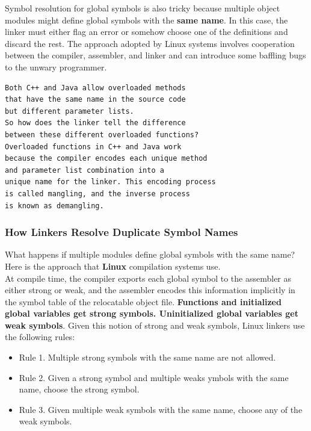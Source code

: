 \documentclass[11pt]{article}
\begin{document}
Symbol resolution for global symbols is also tricky because multiple object modules might define global symbols with the \textbf{same name}. In this case, the linker must either flag an error or somehow choose one of the definitions and discard the rest. The approach adopted by Linux systems involves cooperation between the compiler, assembler, and linker and can introduce some baffling bugs to the unwary programmer.\\


\begin{verbatim}
Both C++ and Java allow overloaded methods 
that have the same name in the source code 
but different parameter lists. 
So how does the linker tell the difference 
between these different overloaded functions? 
Overloaded functions in C++ and Java work 
because the compiler encodes each unique method 
and parameter list combination into a 
unique name for the linker. This encoding process 
is called mangling, and the inverse process 
is known as demangling.
\end{verbatim}

\subsubsection{How Linkers Resolve Duplicate Symbol Names}
\label{sec:org6532746}

What happens if multiple modules define global symbols with the same name?\\
Here is the approach that \textbf{Linux} compilation systems use.\\

At compile time, the compiler exports each global symbol to the assembler as either strong or weak, and the assembler encodes this information implicitly in the symbol table of the relocatable object file. \textbf{Functions and initialized global variables get strong symbols. Uninitialized global variables get weak symbols}. Given this notion of strong and weak symbols, Linux linkers use the following rules:\\
\begin{itemize}
\item Rule 1. Multiple strong symbols with the same name are not allowed.\\
\item Rule 2. Given a strong symbol and multiple weaks ymbols with the same name, choose the strong symbol.\\
\item Rule 3. Given multiple weak symbols with the same name, choose any of the weak symbols.\\
\end{itemize}
\end{document}
